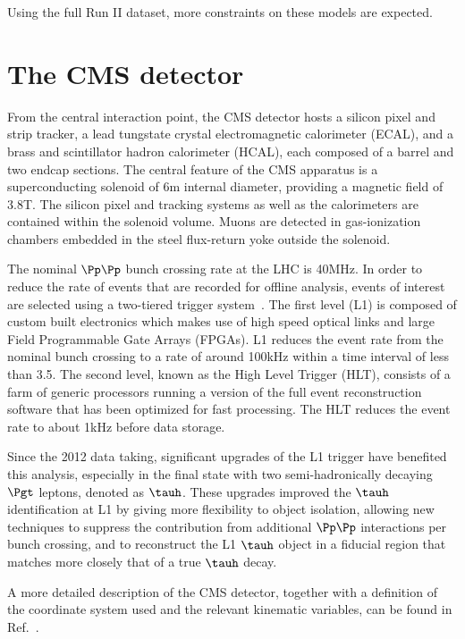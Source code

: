Using the full Run II dataset, more constraints on these models are expected.




\section{The CMS detector}
From the central interaction point, the CMS detector hosts
a silicon pixel and strip tracker, a lead tungstate crystal electromagnetic
calorimeter (ECAL), and a brass and scintillator hadron calorimeter (HCAL),
each composed of a barrel and two endcap sections. The central feature of
the CMS apparatus is a superconducting solenoid of 6\unit{m} internal diameter, providing
a magnetic field of 3.8\unit{T}. The silicon pixel and tracking systems as well as
the calorimeters are contained within the solenoid volume. Muons are detected
in gas-ionization chambers embedded in the steel flux-return yoke outside the
solenoid. %

The nominal $\Pp\Pp$ bunch crossing rate at the LHC is 40\unit{MHz}. In order to reduce the rate of 
events that are recorded for offline analysis, events of interest are selected
using a two-tiered trigger system~\cite{Khachatryan:2016bia}.
The first level (L1) is composed of custom built electronics which makes use of
high speed optical links and large Field Programmable Gate Arrays (FPGAs). 
L1 reduces the event rate from the nominal bunch crossing to a rate of around
100\unit{kHz} within a time interval of less than 3.5\mus.
The second level, known as the High Level Trigger (HLT), consists of a farm of 
generic processors running a version of the full event reconstruction software that
 has been optimized for fast processing. The HLT reduces the event rate to about
1\unit{kHz} before data storage.

Since the 2012 data taking, significant upgrades of the L1 trigger 
have benefited this analysis, especially in the final state with two semi-hadronically decaying 
$\Pgt$ leptons, denoted as $\tauh$.  
These upgrades improved the $\tauh$ identification at L1 by giving more flexibility 
to object isolation, allowing new techniques to suppress the contribution from 
additional $\Pp\Pp$ interactions per bunch
crossing, and to reconstruct the L1 $\tauh$ object in a fiducial region that matches 
more closely that of a true $\tauh$ decay.

A more detailed description of the CMS detector, together with a definition of the 
coordinate system used and the relevant kinematic variables, can be found in 
Ref.~\cite{Chatrchyan:2008zzk}.

